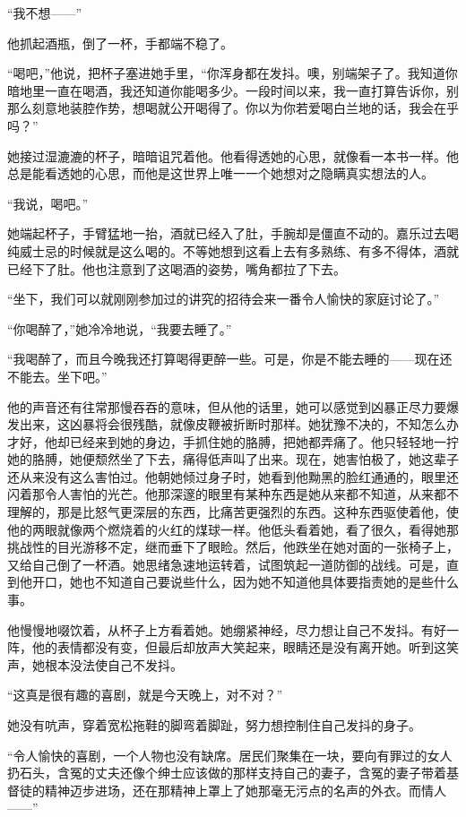 \par “我不想——”
\par 他抓起酒瓶，倒了一杯，手都端不稳了。
\par “喝吧，”他说，把杯子塞进她手里，“你浑身都在发抖。噢，别端架子了。我知道你暗地里一直在喝酒，我还知道你能喝多少。一段时间以来，我一直打算告诉你，别那么刻意地装腔作势，想喝就公开喝得了。你以为你若爱喝白兰地的话，我会在乎吗？”
\par 她接过湿漉漉的杯子，暗暗诅咒着他。他看得透她的心思，就像看一本书一样。他总是能看透她的心思，而他是这世界上唯一一个她想对之隐瞒真实想法的人。
\par “我说，喝吧。”
\par 她端起杯子，手臂猛地一抬，酒就已经入了肚，手腕却是僵直不动的。嘉乐过去喝纯威士忌的时候就是这么喝的。不等她想到这看上去有多熟练、有多不得体，酒就已经下了肚。他也注意到了这喝酒的姿势，嘴角都拉了下去。
\par “坐下，我们可以就刚刚参加过的讲究的招待会来一番令人愉快的家庭讨论了。”
\par “你喝醉了，”她冷冷地说，“我要去睡了。”
\par “我喝醉了，而且今晚我还打算喝得更醉一些。可是，你是不能去睡的——现在还不能去。坐下吧。”
\par 他的声音还有往常那慢吞吞的意味，但从他的话里，她可以感觉到凶暴正尽力要爆发出来，这凶暴将会很残酷，就像皮鞭被折断时那样。她犹豫不决的，不知怎么办才好，他却已经来到她的身边，手抓住她的胳膊，把她都弄痛了。他只轻轻地一拧她的胳膊，她便颓然坐了下去，痛得低声叫了出来。现在，她害怕极了，她这辈子还从来没有这么害怕过。他朝她倾过身子时，她看到他黝黑的脸红通通的，眼里还闪着那令人害怕的光芒。他那深邃的眼里有某种东西是她从来都不知道，从来都不理解的，那是比怒气更深层的东西，比痛苦更强烈的东西。这种东西驱使着他，使他的两眼就像两个燃烧着的火红的煤球一样。他低头看着她，看了很久，看得她那挑战性的目光游移不定，继而垂下了眼睑。然后，他跌坐在她对面的一张椅子上，又给自己倒了一杯酒。她思绪急速地运转着，试图筑起一道防御的战线。可是，直到他开口，她也不知道自己要说些什么，因为她不知道他具体要指责她的是些什么事。
\par 他慢慢地啜饮着，从杯子上方看着她。她绷紧神经，尽力想让自己不发抖。有好一阵，他的表情都没有变，但最后却放声大笑起来，眼睛还是没有离开她。听到这笑声，她根本没法使自己不发抖。
\par “这真是很有趣的喜剧，就是今天晚上，对不对？”
\par 她没有吭声，穿着宽松拖鞋的脚弯着脚趾，努力想控制住自己发抖的身子。
\par “令人愉快的喜剧，一个人物也没有缺席。居民们聚集在一块，要向有罪过的女人扔石头，含冤的丈夫还像个绅士应该做的那样支持自己的妻子，含冤的妻子带着基督徒的精神迈步进场，还在那精神上罩上了她那毫无污点的名声的外衣。而情人——”
